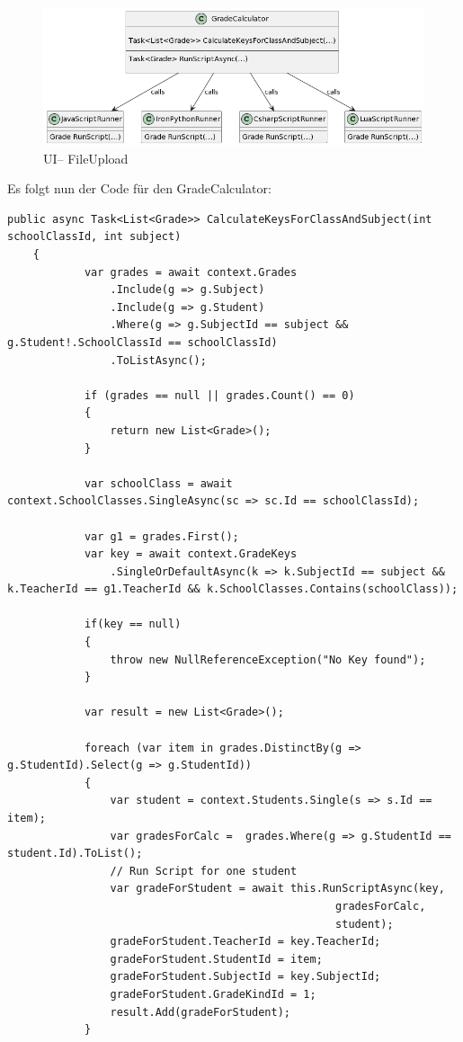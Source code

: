 \begin{figure}[H]
    \centering
    \includegraphics[scale=0.5]{pics/LogicClassDiagram.png}
    \caption{UI-- FileUpload}
    \label{fig:impl:Logic}
\end{figure}
\newpage
Es folgt nun der Code für den GradeCalculator: 

\begin{lstlisting}[language={[Sharp]C}, caption=Code for loading data for Calculation, label=lst:imp:calc]
    public async Task<List<Grade>> CalculateKeysForClassAndSubject(int schoolClassId, int subject)
    {
            var grades = await context.Grades
                .Include(g => g.Subject)
                .Include(g => g.Student)
                .Where(g => g.SubjectId == subject && g.Student!.SchoolClassId == schoolClassId)
                .ToListAsync();

            if (grades == null || grades.Count() == 0)
            {
                return new List<Grade>();
            }

            var schoolClass = await context.SchoolClasses.SingleAsync(sc => sc.Id == schoolClassId);

            var g1 = grades.First();
            var key = await context.GradeKeys
                .SingleOrDefaultAsync(k => k.SubjectId == subject && k.TeacherId == g1.TeacherId && k.SchoolClasses.Contains(schoolClass));

            if(key == null)
            {
                throw new NullReferenceException("No Key found");
            }
                
            var result = new List<Grade>();

            foreach (var item in grades.DistinctBy(g => g.StudentId).Select(g => g.StudentId))
            {
                var student = context.Students.Single(s => s.Id == item);
                var gradesForCalc =  grades.Where(g => g.StudentId == student.Id).ToList();
                // Run Script for one student
                var gradeForStudent = await this.RunScriptAsync(key, 
                                                   gradesForCalc, 
                                                   student);
                gradeForStudent.TeacherId = key.TeacherId;
                gradeForStudent.StudentId = item;
                gradeForStudent.SubjectId = key.SubjectId;
                gradeForStudent.GradeKindId = 1;
                result.Add(gradeForStudent);
            }


\end{lstlisting}
